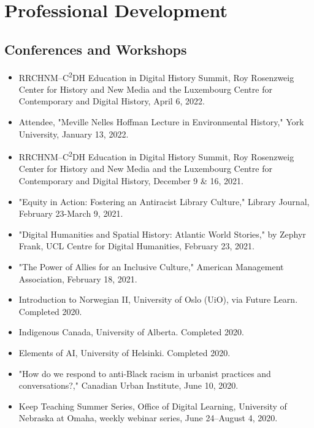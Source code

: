 \documentclass[10pt]{article}
\begin{document}
\section{Professional Development}

\subsection*{Conferences and Workshops}
\begin{itemize}
  \item RRCHNM--C\textsuperscript{2}DH Education in Digital History Summit, Roy Rosenzweig Center for History and New Media and the Luxembourg Centre for Contemporary and Digital History, April 6, 2022.
  
  \item Attendee, "Meville Nelles Hoffman Lecture in Environmental History," York University, January 13, 2022.
  
  \item RRCHNM--C\textsuperscript{2}DH Education in Digital History Summit, Roy Rosenzweig Center for History and New Media and the Luxembourg Centre for Contemporary and Digital History, December 9 \& 16, 2021.
  
  \item "Equity in Action: Fostering an Antiracist Library Culture," Library Journal, February 23-March 9, 2021.
  
  \item "Digital Humanities and Spatial History: Atlantic World Stories," by Zephyr Frank, UCL Centre for Digital Humanities, February 23, 2021.
  
  \item "The Power of Allies for an Inclusive Culture," American Management Association, February 18, 2021.
  
  \item Introduction to Norwegian II, University of Oslo (UiO), via Future Learn. Completed 2020.
  
  \item Indigenous Canada, University of Alberta. Completed 2020.
  
  \item Elements of AI, University of Helsinki. Completed 2020.
  
  \item "How do we respond to anti-Black racism in urbanist practices and conversations?," Canadian Urban Institute, June 10, 2020.
  
  \item Keep Teaching Summer Series, Office of Digital Learning, University of Nebraska at Omaha, weekly webinar series, June 24--August 4, 2020.
  

\end{itemize}
\end{document}
